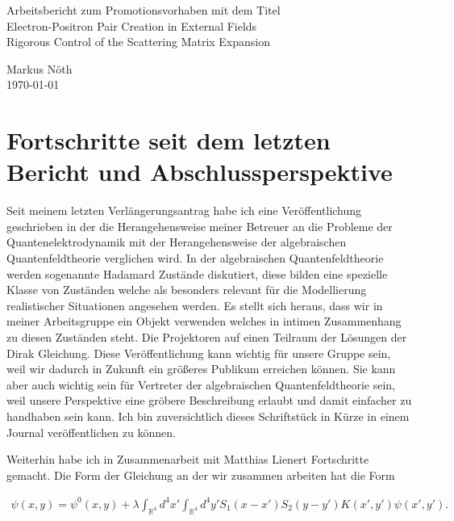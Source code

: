 \documentclass[a4paper,12pt]{article}
\begin{document}
\begin{center}
{\huge Arbeitsbericht zum Promotionsvorhaben mit dem Titel
\\
{\Large Electron-Positron Pair Creation in External Fields \\
Rigorous Control of the Scattering Matrix Expansion}}
\end{center}

\begin{center}
Markus Nöth
\\ \today
\end{center}

\section{Fortschritte seit dem letzten Bericht und Abschlussperspektive}

Seit meinem letzten Verlängerungsantrag habe ich eine Veröffentlichung geschrieben in der die Herangehensweise meiner Betreuer
 an die Probleme der Quantenelektrodynamik mit der Herangehensweise der algebraischen Quantenfeldtheorie verglichen wird. 
 In der algebraischen Quantenfeldtheorie werden sogenannte Hadamard Zustände diskutiert, diese bilden eine spezielle Klasse von Zuständen
 welche als besonders relevant für die Modellierung realistischer Situationen angesehen werden. Es stellt sich heraus, dass 
 wir in meiner Arbeitsgruppe ein Objekt verwenden welches in intimen Zusammenhang zu diesen Zuständen steht. Die Projektoren auf einen
 Teilraum der Lösungen der Dirak Gleichung. Diese Veröffentlichung kann wichtig für unsere Gruppe sein, weil wir dadurch in Zukunft ein größeres
 Publikum erreichen können. Sie kann aber auch wichtig sein für Vertreter der algebraischen Quantenfeldtheorie sein, weil unsere Perspektive eine gröbere 
 Beschreibung erlaubt und damit einfacher zu handhaben sein kann.
 Ich bin zuversichtlich dieses Schriftstück in Kürze in einem Journal veröffentlichen zu können. 
 
 Weiterhin habe ich in Zusammenarbeit mit Matthias Lienert Fortschritte gemacht. Die Form der Gleichung an der wir zusammen arbeiten hat die Form
 
 \begin{align}
\psi(x,y)=\psi^0(x,y) + \lambda \int_{\mathbb{R}^4} d^4 x' \int_{\mathbb{R}^4} d^4y' S_1(x-x')S_2(y-y') K(x',y') \psi(x',y').
\end{align}
\end{document}
